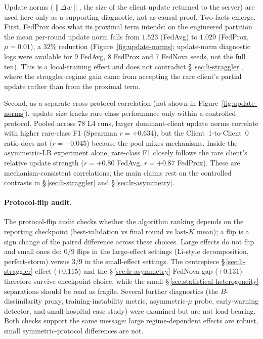\documentclass[11pt,a4paper]{report}
\begin{document}
Update norms ($\lVert \Delta w \rVert$, the size of the client update returned to
the server) are used here only as a supporting diagnostic, not as causal proof.
Two facts emerge. First, FedProx does what its proximal term intends: on the
engineered partition the mean per-round update norm falls from $1.523$
(FedAvg) to $1.029$ (FedProx, $\mu=0.01$), a $32\%$ reduction
(Figure~\ref{fig:update-norms}; update-norm diagnostic logs were available for
$9$ FedAvg, $8$ FedProx and $7$ FedNova seeds, not the full ten). This is a local-training effect and does not
contradict \S\,\ref{sec:li-straggler}, where the straggler-regime gain came from
accepting the rare client's partial update rather than from the proximal term.

Second, as a separate cross-protocol correlation (not shown in
Figure~\ref{fig:update-norms}), update size tracks rare-class performance only
within a controlled protocol. Pooled across 78 L4 runs, larger dominant-client
update norms correlate with higher rare-class F1 (Spearman $r=+0.634$), but the
Client~1-to-Client~0 ratio does not ($r=-0.045$) because the pool mixes mechanisms.
Inside the asymmetric-LR experiment alone, rare-class F1 closely follows the rare
client's relative update strength ($r=+0.80$ FedAvg, $r=+0.87$ FedProx). These are
mechanism-consistent correlations; the main claims rest on the
controlled contrasts in \S\,\ref{sec:li-straggler} and \S\,\ref{sec:lr-asymmetry}.

\paragraph{Protocol-flip audit.}

The protocol-flip audit checks whether the algorithm ranking depends on the
reporting checkpoint (best-validation vs final round vs last-$K$ mean); a flip is
a sign change of the paired difference across these choices. Large effects do not
flip and small ones do: $0/9$ flips in the large-effect settings (Li-style
decomposition, perfect-storm) versus $3/9$ in the small-effect settings. The
centrepiece \S\,\ref{sec:li-straggler} effect ($+0.115$) and the
\S\,\ref{sec:lr-asymmetry} FedNova gap ($+0.131$) therefore survive
checkpoint choice, while the small \S\,\ref{sec:statistical-heterogeneity}
separations should be read as fragile. Several further diagnostics (the
$B$-dissimilarity proxy, training-instability metric, asymmetric-$\mu$ probe,
early-warning detector, and small-hospital case study) were examined but are not
load-bearing. Both checks support the same message: large regime-dependent effects
are robust, small symmetric-protocol differences are not.
\end{document}
